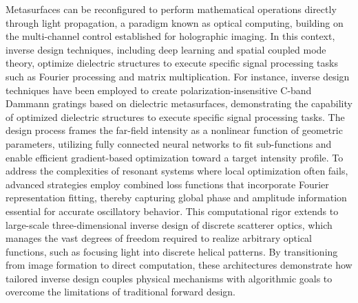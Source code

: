 \documentclass[11pt]{article}
\begin{document}
Metasurfaces can be reconfigured to perform mathematical operations directly through light propagation, a paradigm known as optical computing, building on the multi-channel control established for holographic imaging. In this context, inverse design techniques, including deep learning and spatial coupled mode theory, optimize dielectric structures to execute specific signal processing tasks such as Fourier processing and matrix multiplication. For instance, inverse design techniques have been employed to create polarization-insensitive C-band Dammann gratings based on dielectric metasurfaces, demonstrating the capability of optimized dielectric structures to execute specific signal processing tasks. \citep{doi_10_1016_j_rinp_2023_106238_0ebde0ff} The design process frames the far-field intensity as a nonlinear function of geometric parameters, utilizing fully connected neural networks to fit sub-functions and enable efficient gradient-based optimization toward a target intensity profile. To address the complexities of resonant systems where local optimization often fails, advanced strategies employ combined loss functions that incorporate Fourier representation fitting, thereby capturing global phase and amplitude information essential for accurate oscillatory behavior. This computational rigor extends to large-scale three-dimensional inverse design of discrete scatterer optics, which manages the vast degrees of freedom required to realize arbitrary optical functions, such as focusing light into discrete helical patterns. By transitioning from image formation to direct computation, these architectures demonstrate how tailored inverse design couples physical mechanisms with algorithmic goals to overcome the limitations of traditional forward design. \citep{doi_10_1021_acsphotonics_4c00171_f68cb79c} \citep{doi_10_1515_nanoph_2020_0379_1cc596ab} \citep{doi_10_1117_12_2511323_41684364}
\end{document}
